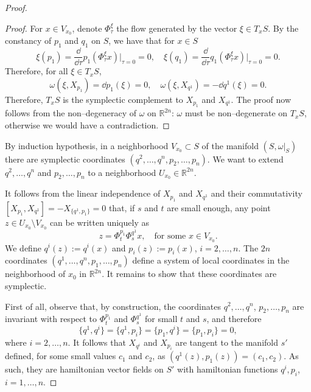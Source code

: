 \documentclass[english,fontsize=11pt,paper=b5]{scrbook}
\numberwithin{equation}{chapter}
\theoremstyle{definition}
\begin{document}
\begin{proof}
\begin{proof}
        For $x\in V_{x_0}$, denote $\Phi_\tau^\xi$ the flow generated by the vector $\xi\in T_x S$.
        By the constancy of $p_1$ and $q_1$ on $S$, we have that for $x\in S$
        \begin{equation}
          \xi(p_1) = \frac{\dd}{\dd\tau} p_1(\Phi_\tau^\xi x)\Big|_{\tau=0} = 0, \quad
          \xi(q_1) = \frac{\dd}{\dd\tau} q_1(\Phi_\tau^\xi x)\Big|_{\tau=0} = 0.
        \end{equation}
        Therefore, for all $\xi \in T_x S$,
        \begin{equation}
          \omega(\xi, X_{p_1}) = \dd p_1(\xi) = 0,\quad
          \omega(\xi, X_{q^1}) = -\dd q^1(\xi) = 0.
        \end{equation}
        Therefore, $T_x S$ is the symplectic complement to $X_{p_1}$ and $X_{q^1}$.
        The proof now follows from the non--degeneracy of $\omega$ on $\mathbb{R}^{2n}$: $\omega$ must be non--degenerate on $T_x S$, otherwise we would have a contradiction.
      \end{proof}

      By induction hypothesis, in a neighborhood $V_{x_0}\subset S$ of the manifold $(S, \omega|_S)$ there are symplectic coordinates $(q^2, \ldots, q^n, p_2, \ldots, p_n)$. We want to extend $q^2, \ldots, q^n$ and $p_2, \ldots, p_n$ to a neighborhood $U_{x_0}\in\mathbb{R}^{2n}$.

      It follows from the linear independence of $X_{p_1}$ and $X_{q^1}$ and their commutativity $[X_{p_1}, X_{q^1}] = -X_{\big\{q^1,p_1\big\}} = 0$ that, if $s$ and $t$ are small enough, any point $z\in U_{x_0}\setminus V_{x_0}$ can be written uniquely as
      \begin{equation}
        z = \Phi_t^{p_1}\Phi_s^{q^1} x, \quad\mbox{for some }x\in V_{x_0}.
      \end{equation}
      We define $q^i(z) := q^i(x)$ and $p_i(z) := p_i(x)$, $i=2,\ldots,n$.
      The $2n$ coordinates $(q^1, \ldots, q^n, p_1, \ldots, p_n)$ define a system of local coordinates in the neighborhood of $x_0$ in $\mathbb{R}^{2n}$. It remains to show that these coordinates are symplectic.

      First of all, observe that, by construction, the coordinates $q^2, \ldots, q^n$, $p_2, \ldots, p_n$ are invariant with respect to $\Phi_t^{p_1}$ and $\Phi_s^{q^1}$ for small $t$ and $s$, and therefore
      \begin{equation}
        \big\{q^1, q^i\big\} = \big\{q^1, p_i\big\} = \big\{p_1, q^i\big\} = \big\{p_1, p_i\big\} = 0,
      \end{equation}
      where $i = 2,\ldots,n$.
      It follows that $X_{q^i}$ and $X_{p_i}$ are tangent to the manifold $s'$ defined, for some small values $c_1$ and $c_2$, as $(q^1(z), p_1(z)) = (c_1, c_2)$.
      As such, they are hamiltonian vector fields on $S'$ with hamiltonian functions $q^i, p_i$, $i=1,\ldots,n$.


\end{proof}
\end{document}
